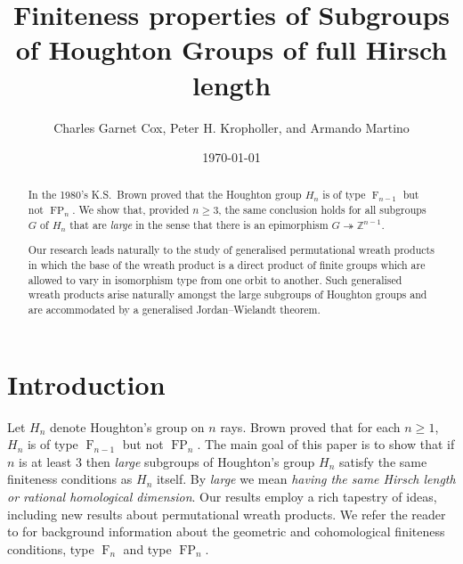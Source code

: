 \documentclass[11pt,a4paper]{amsart}
\title[Subgroups of Houghton Groups]
{Finiteness properties of Subgroups of Houghton Groups of full Hirsch length}
\author{Charles Garnet Cox, Peter H. Kropholler, and Armando Martino}
\date{\today} %
\theoremstyle{definition}
\theoremstyle{remark}
\newcommand{\Z}{\mathbb Z}
\newcommand{\FFF}{\operatorname{F}}
\newcommand{\FP}{\operatorname{FP}}
\begin{document}
\begin{abstract}
In the 1980’s K.S.\ Brown proved that the Houghton group $H_n$ is of type $\FFF_{n-1}$ but not $\FP_n$. We show that, provided $n\ge3$, the same conclusion holds for all subgroups $G$ of $H_n$ that are \emph{large} in the sense that there is an epimorphism $G\twoheadrightarrow\Z^{n-1}$.

Our research leads naturally to the study of generalised permutational wreath products in which the base of the wreath product is a direct product of finite groups which are allowed to vary in isomorphism type from one orbit to another. Such generalised wreath products arise naturally amongst the large subgroups of Houghton groups and are accommodated by a generalised Jordan--Wielandt theorem.
\end{abstract}


\maketitle

\tableofcontents

\section{Introduction}
Let $H_n$ denote Houghton's group on $n$ rays. 
Brown proved \cite{Brown1987} that for each $n\ge1$, $H_n$ is of type $\FFF_{n-1}$ but not $\FP_n$. The main goal of this paper is to show that if $n$ is at least $3$ then \emph{large} subgroups of Houghton's group $H_n$ satisfy the same finiteness conditions as $H_n$ itself. By \emph{large} we mean \emph{having the same Hirsch length or rational homological dimension}. Our results employ a rich tapestry of ideas, including new results about permutational wreath products.
We refer the reader to \cite{BB,Bieri,Brown1987} for background information about the geometric and cohomological finiteness conditions, type $\FFF_n$ and type $\FP_n$. 
\end{document}
